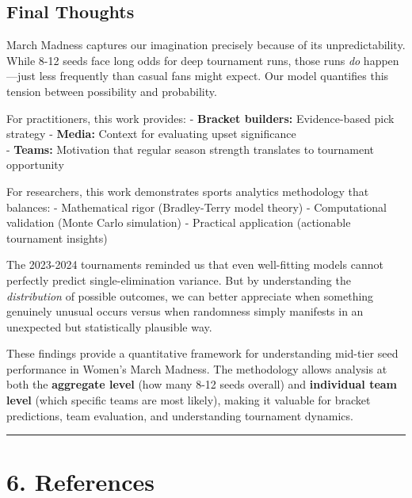 \documentclass[
]{article}
\begin{document}
\subsection{Final Thoughts}\label{final-thoughts}

March Madness captures our imagination precisely because of its
unpredictability. While 8-12 seeds face long odds for deep tournament
runs, those runs \emph{do} happen---just less frequently than casual
fans might expect. Our model quantifies this tension between possibility
and probability.

For practitioners, this work provides: - \textbf{Bracket builders:}
Evidence-based pick strategy - \textbf{Media:} Context for evaluating
upset significance\\
- \textbf{Teams:} Motivation that regular season strength translates to
tournament opportunity

For researchers, this work demonstrates sports analytics methodology
that balances: - Mathematical rigor (Bradley-Terry model theory) -
Computational validation (Monte Carlo simulation) - Practical
application (actionable tournament insights)

The 2023-2024 tournaments reminded us that even well-fitting models
cannot perfectly predict single-elimination variance. But by
understanding the \emph{distribution} of possible outcomes, we can
better appreciate when something genuinely unusual occurs versus when
randomness simply manifests in an unexpected but statistically plausible
way.

These findings provide a quantitative framework for understanding
mid-tier seed performance in Women's March Madness. The methodology
allows analysis at both the \textbf{aggregate level} (how many 8-12
seeds overall) and \textbf{individual team level} (which specific teams
are most likely), making it valuable for bracket predictions, team
evaluation, and understanding tournament dynamics.

\begin{center}\rule{0.5\linewidth}{0.5pt}\end{center}

\section{6. References}\label{references}
\end{document}
